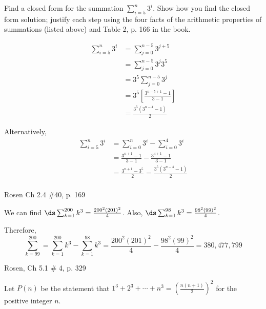 \begin{questions}
 Find a closed form for the summation $\displaystyle \sum_{i=5}^n 3^i$.  Show how you find the closed form solution; justify each step using the four facts of the arithmetic properties of summations (listed above) and Table 2, p. 166 in the book.
    \ifprintanswers
        \vspace{-10pt}
   \fi
\begin{solution}
    \begin{align*}
        \sum_{i=5}^n 3^i  & = \sum_{j=0}^{n-5} 3^{j+5} \tag{change of index} \\
        & = \sum_{j=0}^{n-5} 3^{j}3^{5} \tag{algebra} \\
        & = 3^5 \sum_{j=0}^{n-5} 3^j    \tag{Fact 4} \\
        & = 3^5 \left[ \frac{3^{n-5+1} - 1}{3 - 1} \right] \tag{Table } \\
        & = \frac{ 3^5(3^{n-4} - 1) }{ 2 } \tag{algebra}
    \end{align*}

    Alternatively, 
    \begin{align*}
        \sum_{i=5}^n 3^i &= \sum_{i=0}^n 3^i - \sum_{i=0}^4 3^i \tag{change index} \\
        &= \frac{3^{n+1} - 1}{3 - 1} - \frac{3^{4+1} - 1}{3 -1} \tag{Table 2}\\
        &= \frac{3^{n+1} - 3^{5}}{2} = \frac{3^5(3^{n-4} - 1)}{2} \tag{algebra} \\
    \end{align*}
\end{solution}



 Rosen Ch 2.4 \#40, p. 169
    \ifprintanswers
        \vspace{-10pt}
   \fi
\begin{solution}
 We can find $\ds \sum_{k=1}^{200} k^3 = \frac{200^2(201)^2}{4}$.
 Also, $\ds \sum_{k=1}^{98} k^3 = \frac{98^2(99)^2}{4}$.

 Therefore,
$$ \sum_{k=99}^{200} = \sum_{k=1}^{200} k^3 - \sum_{k=1}^{98} k^3
   = \frac{200^2(201)^2}{4} - \frac{98^2(99)^2}{4} 
   = 380,477,799 $$
\end{solution}






 Rosen, Ch 5.1 \# 4, p. 329
    \ifprintanswers
        \vspace{-10pt}
   \fi
\begin{solution}
Let $P(n)$ be the statement that $1^3 + 2^3 + \cdots + n^3 = \left( \frac{n(n+1)}{2} \right)^2$ for the positive integer $n$.
\begin{parts}

\end{parts}
\end{solution}
\end{questions}
